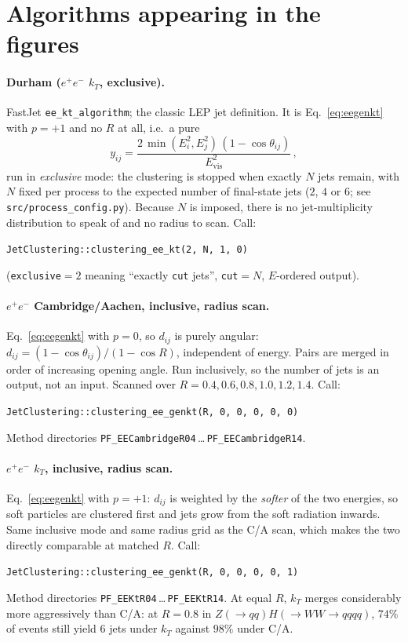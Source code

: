 \documentclass[11pt,a4paper]{article}
\newcommand{\ee}{$e^{+}e^{-}$}
\newcommand{\dij}{d_{ij}}
\begin{document}
\section*{Algorithms appearing in the figures}

\paragraph{Durham (\ee{} $k_T$, exclusive).}
FastJet \texttt{ee\_kt\_algorithm}; the classic LEP jet definition. It is
Eq.~\eqref{eq:eegenkt} with $p=+1$ and no $R$ at all, i.e.\ a pure
\[
  y_{ij} = \frac{2\,\min(E_i^2, E_j^2)\,(1-\cos\theta_{ij})}{E_{\text{vis}}^2}\,,
\]
run in \emph{exclusive} mode: the clustering is stopped when exactly
$N$ jets remain, with $N$ fixed per process to the expected number of
final-state jets ($2$, $4$ or $6$; see \texttt{src/process\_config.py}).
Because $N$ is imposed, there is no jet-multiplicity distribution to speak of
and no radius to scan. Call:
\begin{center}
\texttt{JetClustering::clustering\_ee\_kt(2, N, 1, 0)}
\end{center}
(\texttt{exclusive}${}=2$ meaning ``exactly \texttt{cut} jets'', \texttt{cut}${}=N$,
$E$-ordered output).

\paragraph{\ee{} Cambridge/Aachen, inclusive, radius scan.}
Eq.~\eqref{eq:eegenkt} with $p=0$, so $\dij$ is purely angular:
$\dij = (1-\cos\theta_{ij})/(1-\cos R)$, independent of energy. Pairs are
merged in order of increasing opening angle. Run inclusively, so the number of
jets is an output, not an input. Scanned over
$R = 0.4, 0.6, 0.8, 1.0, 1.2, 1.4$. Call:
\begin{center}
\texttt{JetClustering::clustering\_ee\_genkt(R, 0, 0, 0, 0, 0)}
\end{center}
Method directories \texttt{PF\_EECambridgeR04}\,\dots\,\texttt{PF\_EECambridgeR14}.

\paragraph{\ee{} $k_T$, inclusive, radius scan.}
Eq.~\eqref{eq:eegenkt} with $p=+1$: $\dij$ is weighted by the \emph{softer}
of the two energies, so soft particles are clustered first and jets grow from
the soft radiation inwards. Same inclusive mode and same radius grid as the C/A
scan, which makes the two directly comparable at matched $R$. Call:
\begin{center}
\texttt{JetClustering::clustering\_ee\_genkt(R, 0, 0, 0, 0, 1)}
\end{center}
Method directories \texttt{PF\_EEKtR04}\,\dots\,\texttt{PF\_EEKtR14}.
At equal $R$, $k_T$ merges considerably more aggressively than C/A: at $R=0.8$ in
$Z(\to qq)H(\to WW \to qqqq)$, $74\%$ of events still yield $6$ jets under $k_T$
against $98\%$ under C/A.
\end{document}
